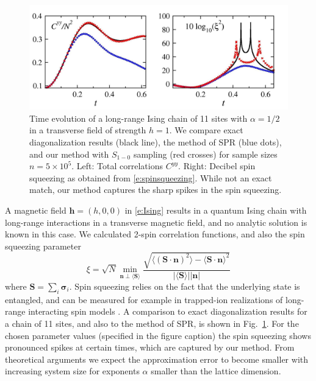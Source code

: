 \documentclass[aps,prl,showpacs,amsmath,amssymb,superscriptaddress,reprint,10pt]{revtex4-1}
\newcommand{\ar}[1]{{\color{analabha} #1}}
\newcommand{\mk}[1]{{\color{michael} #1}}
\newcommand{\mvec}[1]{\boldsymbol #1}
\begin{document}
\begin{bibunit}
\begin{figure}\centering
\includegraphics[width=\linewidth]{./Jz1hx1_Schach_alph05_N11_nt500000.jpg}
\caption{\label{f:TFIM}%
Time evolution of a long-range Ising chain of 11 sites with $\alpha=1/2$ in a transverse field of strength $h=1$. We compare exact diagonalization results (black line), the method of SPR (blue dots), and our method with $S_{1-0}$ sampling \cite{Note1} (red crosses) for sample sizes $n=5\times10^5$. Left: Total correlations $C^{yy}$. Right: Decibel spin squeezing as obtained from \eqref{e:spinsqueezing}. While not an exact match, our method captures the sharp spikes in the spin squeezing.
}%
\end{figure}

A magnetic field $\mvec{h}=(h,0,0)$ in \eqref{e:Ising} results in a quantum Ising chain with long-range interactions in a transverse magnetic field, and no analytic solution is known in this case. \mk{We calculated 2-spin correlation functions, and also the spin squeezing parameter~\cite{Wineland_etal92,*Ma_etal11}
\begin{equation}\label{e:spinsqueezing}
\xi = \sqrt{N}\min_{\mvec{n}\perp\langle\mvec{S}\rangle}\frac{\sqrt{\langle(\mvec{S}\cdot\mvec{n})^2\rangle - \langle\mvec{S}\cdot\mvec{n}\rangle^2}}{|\langle\mvec{S}\rangle||\mvec{n}|}
\end{equation}
where $\mvec{S}=\sum_i \mvec{\sigma}_i$. Spin squeezing \ar{relies on the fact that the underlying state is entangled}, and can be measured for example in trapped-ion realizations of long-range interacting spin models \cite{}.} %
A comparison to exact diagonalization results for a chain of 11 sites, and also to the method of SPR, is shown in Fig.~\ref{f:TFIM}. For the chosen parameter values (specified in the figure caption) the spin squeezing shows pronounced spikes at certain times, which are captured by our method. From theoretical arguments we expect the approximation error to become smaller with increasing system size for exponents $\alpha$ smaller than the lattice dimension. 


\end{bibunit}
\end{document}
